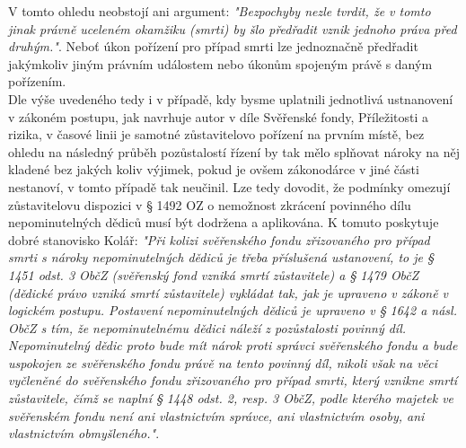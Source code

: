 \documentclass{article}
\begin{document}
 V tomto ohledu neobstojí ani argument: \textit{"Bezpochyby nezle tvrdit, že v tomto jinak právně uceleném okamžiku (smrti) by šlo předřadit vznik jednoho práva před druhým."}. Neboť úkon pořízení pro případ smrti lze jednoznačně předřadit jakýmkoliv jiným právním událostem nebo úkonům spojeným právě s daným pořízením.\\
 
 
 
 Dle výše uvedeného tedy i v případě, kdy bysme uplatnili jednotlivá ustnanovení v zákoném postupu, jak navrhuje autor v díle Svěřenské fondy, Příležitosti a rizika, v časové linii je samotné zůstavitelovo pořízení na prvním místě, bez ohledu na následný průběh pozůstalostí řízení by tak mělo splňovat nároky na něj kladené bez jakých koliv výjimek, pokud je ovšem zákonodárce v jiné části nestanoví, v tomto případě tak neučinil. Lze tedy dovodit, že podmínky omezují zůstavitelovu dispozici v § 1492 OZ o nemožnost zkrácení povinného dílu nepominutelných dědiců musí být dodržena a aplikována. K tomuto poskytuje dobré stanovisko Kolář: \textit{"Při kolizi svěřenského fondu zřizovaného pro případ smrti s nároky nepominutelných dědiců je třeba příslušená ustanovení, to je § 1451 odst. 3 ObčZ (svěřenský fond vzniká smrtí zůstavitele) a § 1479 ObčZ (dědické právo vzniká smrtí zůstavitele) vykládat tak, jak je upraveno v zákoně v logickém postupu. Postavení nepominutelných dědiců je upraveno v § 1642 a násl. ObčZ s tím, že nepominutelnému dědici náleží z pozůstalosti povinný díl. Nepominutelný dědic proto bude mít nárok proti správci svěřenského fondu a bude uspokojen ze svěřenského fondu právě na tento povinný díl, nikoli však na věci vyčleněné do svěřenského fondu zřizovaného pro případ smrti, který vznikne smrtí zůstavitele, čímž se naplní § 1448 odst. 2, resp. 3 ObčZ, podle kterého majetek ve svěřenském fondu není ani vlastnictvím správce, ani vlastnictvím osoby, ani vlastnictvím obmyšleného."}.\\
 
\end{document}
